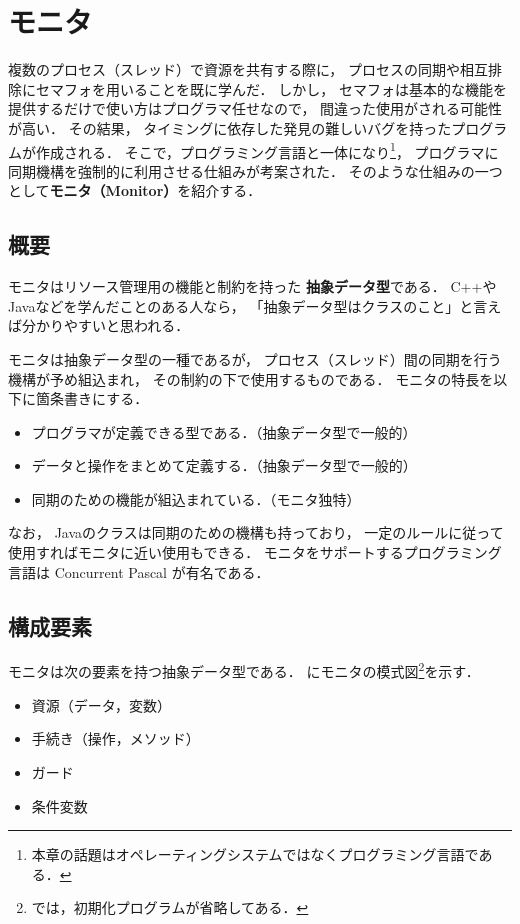 \chapter{モニタ}
\label{monitor}
複数のプロセス（スレッド）で資源を共有する際に，
プロセスの同期や相互排除にセマフォを用いることを既に学んだ．
しかし，
セマフォは基本的な機能を提供するだけで使い方はプログラマ任せなので，
間違った使用がされる可能性が高い．
その結果，
タイミングに依存した発見の難しいバグを持ったプログラムが作成される．
そこで，プログラミング言語と一体になり\footnote{
本章の話題はオペレーティングシステムではなくプログラミング言語である．}，
プログラマに同期機構を強制的に利用させる仕組みが考案された．
そのような仕組みの一つとして{\bf モニタ（Monitor）}を紹介する．

\section{概要}
モニタはリソース管理用の機能と制約を持った
{\bf 抽象データ型}\cite{AbstractDataType}である．
C++やJavaなどを学んだことのある人なら，
「抽象データ型はクラスのこと」と言えば分かりやすいと思われる．

モニタは抽象データ型の一種であるが，
プロセス（スレッド）間の同期を行う機構が予め組込まれ，
その制約の下で使用するものである．
モニタの特長を以下に箇条書きにする．

\begin{itemize}
\item プログラマが定義できる型である．（抽象データ型で一般的）
\item データと操作をまとめて定義する．（抽象データ型で一般的）
\item 同期のための機能が組込まれている．（モニタ独特）
\end{itemize}

なお，
Javaのクラスは同期のための機構も持っており，
一定のルールに従って使用すればモニタに近い使用もできる．
モニタをサポートするプログラミング言語は Concurrent Pascal が有名である．

\section{構成要素}
モニタは次の要素を持つ抽象データ型である．
にモニタの模式図\footnote{
では，初期化プログラムが省略してある．}を示す．

\begin{itemize}
\item 資源（データ，変数）
\item 手続き（操作，メソッド）
\item ガード
\item 条件変数
\end{itemize}

